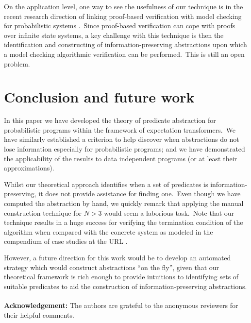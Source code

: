\documentclass[numbers,copyright,creativecommons]{eptcs}
\begin{document}
On the application level, one way to see the usefulness of our technique is in the recent research direction of linking proof-based verification with model checking for probabilistic systems \cite{Ndukwu09, Ndukwu10}.\ Since proof-based verification can cope with proofs over infinite state systems, a key challenge with this technique is then the identification and constructing of information-preserving abstractions upon which a model checking algorithmic verification can be performed.\ This is still an open problem.

\section{Conclusion and future work}

In this paper we have developed the theory of predicate abstraction for probabilistic programs within the framework of expectation transformers.\ We have similarly established a criterion to help discover when abstractions do not lose information especially for probabilistic programs; and we have demonstrated the applicability of the results to data independent programs (or at least their approximations).

Whilst our theoretical approach identifies when a set of predicates is information-preserving, it does not provide assistance for finding one.\ Even though we have computed the abstraction by hand, we quickly remark that applying the manual construction technique for $N > 3$ would seem a laborious task.\ Note that our technique results in a huge success for verifying the termination condition of the algorithm when compared with the concrete system as modeled in the compendium of case studies at the URL \cite{PRISM}.

However, a future direction for this work would be to develop an automated strategy which would construct abstractions ``on the fly'', given that our theoretical framework is rich enough to provide intuitions to identifying sets of suitable predicates to aid the construction of information-preserving abstractions.\\\\
{\bf \noindent \large{Acknowledgement:}} The authors are grateful to the anonymous reviewers for their helpful comments.





\end{document}
